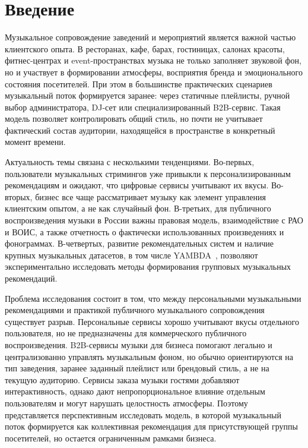 \chapter*{Введение}

Музыкальное сопровождение заведений и мероприятий является важной частью клиентского опыта. В ресторанах, кафе, барах, гостиницах, салонах красоты, фитнес-центрах и event-пространствах музыка не только заполняет звуковой фон, но и участвует в формировании атмосферы, восприятия бренда и эмоционального состояния посетителей. При этом в большинстве практических сценариев музыкальный поток формируется заранее: через статичные плейлисты, ручной выбор администратора, DJ-сет или специализированный B2B-сервис. Такая модель позволяет контролировать общий стиль, но почти не учитывает фактический состав аудитории, находящейся в пространстве в конкретный момент времени.

Актуальность темы связана с несколькими тенденциями. Во-первых, пользователи музыкальных стримингов уже привыкли к персонализированным рекомендациям и ожидают, что цифровые сервисы учитывают их вкусы. Во-вторых, бизнес все чаще рассматривает музыку как элемент управления клиентским опытом, а не как случайный фон. В-третьих, для публичного воспроизведения музыки в России важны правовая модель, взаимодействие с РАО и ВОИС, а также отчетность о фактически использованных произведениях и фонограммах. В-четвертых, развитие рекомендательных систем и наличие крупных музыкальных датасетов, в том числе YAMBDA~\cite{yambda2025}, позволяют экспериментально исследовать методы формирования групповых музыкальных рекомендаций.

Проблема исследования состоит в том, что между персональными музыкальными рекомендациями и практикой публичного музыкального сопровождения существует разрыв. Персональные сервисы хорошо учитывают вкусы отдельного пользователя, но не предназначены для коммерческого публичного воспроизведения. B2B-сервисы музыки для бизнеса помогают легально и централизованно управлять музыкальным фоном, но обычно ориентируются на тип заведения, заранее заданный плейлист или брендовый стиль, а не на текущую аудиторию. Сервисы заказа музыки гостями добавляют интерактивность, однако дают непропорциональное влияние отдельным пользователям и могут нарушать целостность атмосферы. Поэтому представляется перспективным исследовать модель, в которой музыкальный поток формируется как коллективная рекомендация для присутствующей группы посетителей, но остается ограниченным рамками бизнеса.

